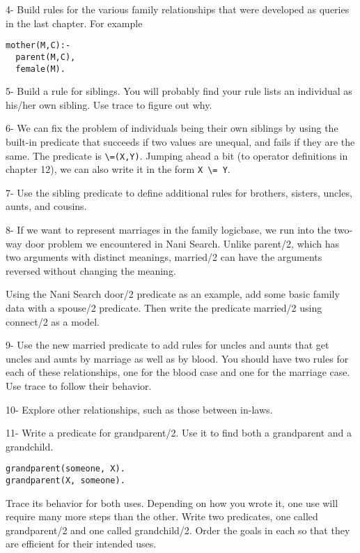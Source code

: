 
4- Build rules for the various family relationships that were developed as
queries in the last chapter. For example

\begin{verbatim}
mother(M,C):-
  parent(M,C),
  female(M).
\end{verbatim}

5- Build a rule for siblings. You will probably find your rule lists an
individual as his/her own sibling. Use trace to figure out why.

6- We can fix the problem of individuals being their own siblings by using the
built-in predicate that succeeds if two values are unequal, and fails if they
are the same. The predicate is \verb'\=(X,Y)'. Jumping ahead a bit (to operator
definitions in chapter 12), we can also write it in the form \verb'X \= Y'.

7- Use the sibling predicate to define additional rules for brothers, sisters,
uncles, aunts, and cousins.

8- If we want to represent marriages in the family logicbase, we run into the
two-way door problem we encountered in Nani Search. Unlike parent/2, which has
two arguments with distinct meanings, married/2 can have the arguments reversed
without changing the meaning.

Using the Nani Search door/2 predicate as an example, add some basic family data
with a spouse/2 predicate. Then write the predicate married/2 using connect/2 as
a model.

9- Use the new married predicate to add rules for uncles and aunts that get
uncles and aunts by marriage as well as by blood. You should have two rules for
each of these relationships, one for the blood case and one for the marriage
case. Use trace to follow their behavior.

10- Explore other relationships, such as those between in-laws.

11- Write a predicate for grandparent/2. Use it to find both a grandparent and a
grandchild.

\begin{verbatim}
grandparent(someone, X).
grandparent(X, someone).
\end{verbatim}
Trace its behavior for both uses. Depending on how you wrote it, one use will
require many more steps than the other. Write two predicates, one called
grandparent/2 and one called grandchild/2. Order the goals in each so that they
are efficient for their intended uses.

